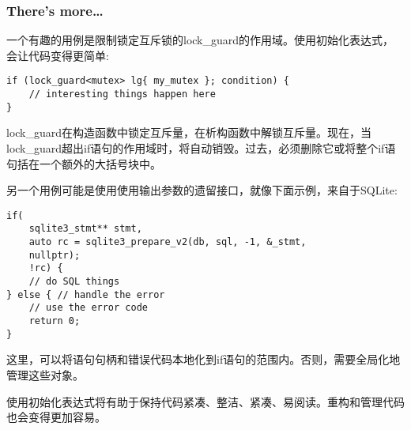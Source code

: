 \subsubsection{There's more…}

一个有趣的用例是限制锁定互斥锁的lock\_guard的作用域。使用初始化表达式，会让代码变得更简单:

\begin{lstlisting}[style=styleCXX]
if (lock_guard<mutex> lg{ my_mutex }; condition) {
	// interesting things happen here
}
\end{lstlisting}

lock\_guard在构造函数中锁定互斥量，在析构函数中解锁互斥量。现在，当lock\_guard超出if语句的作用域时，将自动销毁。过去，必须删除它或将整个if语句括在一个额外的大括号块中。

另一个用例可能是使用使用输出参数的遗留接口，就像下面示例，来自于SQLite:

\begin{lstlisting}[style=styleCXX]
if(
	sqlite3_stmt** stmt,
	auto rc = sqlite3_prepare_v2(db, sql, -1, &_stmt,
	nullptr);
	!rc) {
	// do SQL things
} else { // handle the error
	// use the error code
	return 0;
}
\end{lstlisting}

这里，可以将语句句柄和错误代码本地化到if语句的范围内。否则，需要全局化地管理这些对象。

使用初始化表达式将有助于保持代码紧凑、整洁、紧凑、易阅读。重构和管理代码也会变得更加容易。













